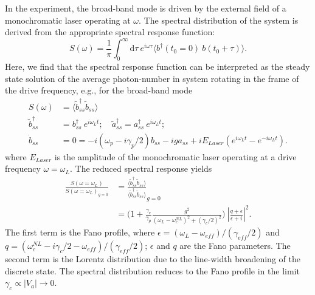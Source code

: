 \documentclass[12pt]{article}
\begin{document}
In the experiment, the broad-band mode is driven by the external
field of a monochromatic laser operating at $\omega$. The spectral 
distribution of the system is derived from the appropriate spectral response 
function: 
\begin{equation}
S(\omega) = \frac{1}{\pi} \int_0^{\infty} \mathrm{d}\tau \: 
    e^{i \omega \tau} 
    \langle b^{\dagger}(t_0=0) \: b(t_0 + \tau) \rangle.
\end{equation}
Here, we find that the spectral response function can be interpreted 
as the steady state solution of the average photon-number in system
rotating in the frame of the drive frequency, e.g., for the broad-band mode
\begin{align}
S(\omega) &= \langle \tilde{b}^{\dagger}_{ss}\tilde{b}_{ss} \rangle
\\
\tilde{b}^{\dagger}_{ss} &= 
    b^{\dagger}_{ss} \: e^{i \omega_L t}; \quad
    \tilde{a}^{\dagger}_{ss} =
    a^{\dagger}_{ss} \: e^{i \omega_L t};
\\
\dot{b}_{ss} &= 0 =
    -i ( \omega_p - i\gamma_p/2 ) b_{ss} - ig a_{ss}
    + iE_{Laser}( e^{i \omega_L t} - e^{-i \omega_L t} ).
\end{align}
where $E_{Laser}$ is the amplitude of the monochromatic laser operating at
a drive frequency $\omega = \omega_L$. The reduced spectral response yields
\begin{equation}
\begin{split}
\frac{ S(\omega = \omega_L) }{ S(\omega = \omega_L)_{g=0} } &= 
    \frac{\langle \tilde{b}^{\dagger}_{ss}\tilde{b}_{ss} \rangle}
        {\langle \tilde{b}^{\dagger}_{ss}\tilde{b}_{ss} \rangle}_{g=0}
\\
&= \Bigg( 1 +
    \frac{\gamma_c}{\gamma_p}
    \frac{g^2}{(\omega_L - \omega_c^{NL})^2 + (\gamma_c/2)^2}
    \Bigg) \:
    \left\vert \frac{q + \epsilon}{\epsilon + i} \right\vert^2.
\end{split}
\end{equation}
The first term is the Fano profile, where 
$\epsilon=(\omega_L - \omega_{eff})/(\gamma_{eff}/2)$ and 
$q = (\omega_c^{NL} - i\gamma_c/2 - \omega_{eff})/(\gamma_{eff}/2)$;
$\epsilon$ and $q$ are the Fano parameters. The second
term is the Lorentz distribution due to the line-width broadening of the
discrete state. The spectral distribution reduces to the Fano profile in the
limit $\gamma_c \propto |V_a| \rightarrow 0$.
\end{document}
